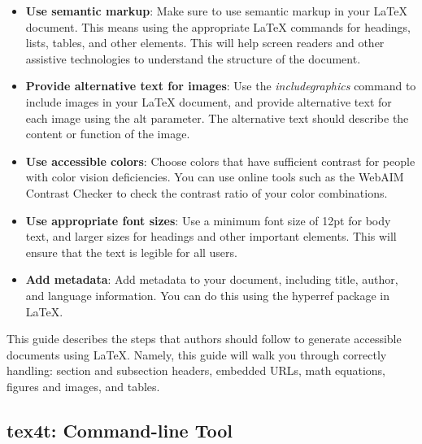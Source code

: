 \documentclass[lang=en]{article}
\begin{document}
\begin{itemize}
\item \textbf{Use semantic markup}: Make sure to use semantic markup in your
  LaTeX document. This means using the appropriate LaTeX commands for
  headings, lists, tables, and other elements. This will help screen readers and
  other assistive technologies to understand the structure of the document.

\item \textbf{Provide alternative text for images}: Use the
  \textit{includegraphics} command to include images in your LaTeX document,
  and provide alternative text for each image using the alt parameter. The
  alternative text should describe the content or function of the image.

\item \textbf{Use accessible colors}: Choose colors that have sufficient
  contrast for people with color vision deficiencies. You can use online tools
  such as the WebAIM Contrast Checker to check the contrast ratio of your color
  combinations.

\item \textbf{Use appropriate font sizes}: Use a minimum font size of 12pt for
  body text, and larger sizes for headings and other important elements. This
  will ensure that the text is legible for all users.

\item \textbf{Add metadata}: Add metadata to your document, including title,
  author, and language information. You can do this using the hyperref package
  in LaTeX.


\end{itemize}


This guide describes the steps that authors should follow to generate accessible
documents using LaTeX. Namely, this guide will walk you through correctly
handling: section and subsection headers, embedded URLs, math equations, figures
and images, and tables.


\subsection{tex4t: Command-line Tool}
\end{document}
